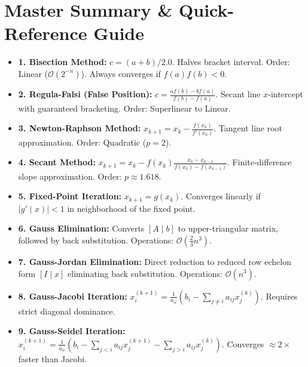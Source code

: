 \documentclass[10pt,a4paper]{report}
\begin{document}
\newpage

\chapter{Master Summary \& Quick-Reference Guide}

\begin{tcolorbox}[colback=codebg,colframe=secondary,title=\textbf{Unit 1: Roots of Non-Linear Equations},boxrule=1.2pt,arc=2mm]
\begin{itemize}[leftmargin=*,itemsep=4pt]
\item \textbf{1. Bisection Method:} $c = (a+b)/2.0$. Halves bracket interval. Order: Linear ($\mathcal{O}(2^{-n})$). Always converges if $f(a)f(b) < 0$.
\item \textbf{2. Regula-Falsi (False Position):} $c = \frac{a f(b) - b f(a)}{f(b) - f(a)}$. Secant line $x$-intercept with guaranteed bracketing. Order: Superlinear to Linear.
\item \textbf{3. Newton-Raphson Method:} $x_{k+1} = x_k - \frac{f(x_k)}{f'(x_k)}$. Tangent line root approximation. Order: Quadratic ($p=2$).
\item \textbf{4. Secant Method:} $x_{k+1} = x_k - f(x_k)\frac{x_k - x_{k-1}}{f(x_k) - f(x_{k-1})}$. Finite-difference slope approximation. Order: $p \approx 1.618$.
\item \textbf{5. Fixed-Point Iteration:} $x_{k+1} = g(x_k)$. Converges linearly if $|g'(x)| < 1$ in neighborhood of the fixed point.
\end{itemize}
\end{tcolorbox}

\begin{tcolorbox}[colback=codebg,colframe=secondary,title=\textbf{Unit 2: Systems of Linear Algebraic Equations},boxrule=1.2pt,arc=2mm]
\begin{itemize}[leftmargin=*,itemsep=4pt]
\item \textbf{6. Gauss Elimination:} Converts $[A \mid b]$ to upper-triangular matrix, followed by back substitution. Operations: $\mathcal{O}(\frac{2}{3}n^3)$.
\item \textbf{7. Gauss-Jordan Elimination:} Direct reduction to reduced row echelon form $[I \mid x]$ eliminating back substitution. Operations: $\mathcal{O}(n^3)$.
\item \textbf{8. Gauss-Jacobi Iteration:} $x_i^{(k+1)} = \frac{1}{a_{ii}}(b_i - \sum_{j \neq i} a_{ij} x_j^{(k)})$. Requires strict diagonal dominance.
\item \textbf{9. Gauss-Seidel Iteration:} $x_i^{(k+1)} = \frac{1}{a_{ii}}(b_i - \sum_{j < i} a_{ij} x_j^{(k+1)} - \sum_{j > i} a_{ij} x_j^{(k)})$. Converges $\approx 2\times$ faster than Jacobi.
\end{itemize}
\end{tcolorbox}
\end{document}
